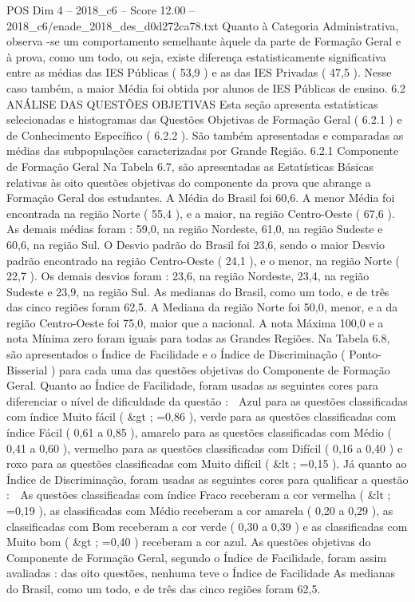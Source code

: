 \begin{textsample}{POS Dim 4 – 2018\_c6 – Score 12.00 – 2018\_c6/enade\_2018\_des\_d0d272ca78.txt}
Quanto à Categoria Administrativa, observa -se um comportamento semelhante àquele da parte de Formação Geral e à prova, como um todo, ou seja, existe diferença estatisticamente significativa entre as médias das IES Públicas ( 53,9 ) e as das IES Privadas ( 47,5 ).
Nesse caso também, a maior Média foi obtida por alunos de IES Públicas de ensino. 6.2 ANÁLISE DAS QUESTÕES OBJETIVAS Esta seção apresenta estatísticas selecionadas e histogramas das Questões Objetivas de Formação Geral ( 6.2.1 ) e de Conhecimento Específico ( 6.2.2 ).
São também apresentadas e comparadas as médias das subpopulações caracterizadas por Grande Região. 6.2.1 Componente de Formação Geral Na Tabela 6.7, são apresentadas as Estatísticas Básicas relativas às oito questões objetivas do componente da prova que abrange a Formação Geral dos estudantes.
A Média do Brasil foi 60,6.
A menor Média foi encontrada na região Norte ( 55,4 ), e a maior, na região Centro-Oeste ( 67,6 ).
As demais médias foram : 59,0, na região Nordeste, 61,0, na região Sudeste e 60,6, na região Sul.
O Desvio padrão do Brasil foi 23,6, sendo o maior Desvio padrão encontrado na região Centro-Oeste ( 24,1 ), e o menor, na região Norte ( 22,7 ).
Os demais desvios foram : 23,6, na região Nordeste, 23,4, na região Sudeste e 23,9, na região Sul.
As medianas do Brasil, como um todo, e de três das cinco regiões foram 62,5.
A Mediana da região Norte foi 50,0, menor, e a da região Centro-Oeste foi 75,0, maior que a nacional.
A nota Máxima 100,0 e a nota Mínima zero foram iguais para todas as Grandes Regiões.
Na Tabela 6.8, são apresentados o Índice de Facilidade e o Índice de Discriminação ( Ponto-Bisserial ) para cada uma das questões objetivas do Componente de Formação Geral.
Quanto ao Índice de Facilidade, foram usadas as seguintes cores para diferenciar o nível de dificuldade da questão :  Azul para as questões classificadas com índice Muito fácil ( \&gt ; =0,86 ), verde para as questões classificadas com índice Fácil ( 0,61 a 0,85 ), amarelo para as questões classificadas com Médio ( 0,41 a 0,60 ), vermelho para as questões classificadas com Difícil ( 0,16 a 0,40 ) e roxo para as questões classificadas com Muito difícil ( \&lt ; =0,15 ).
Já quanto ao Índice de Discriminação, foram usadas as seguintes cores para qualificar a questão :  As questões classificadas com índice Fraco receberam a cor vermelha ( \&lt ; =0,19 ), as classificadas com Médio receberam a cor amarela ( 0,20 a 0,29 ), as classificadas com Bom receberam a cor verde ( 0,30 a 0,39 ) e as classificadas com Muito bom ( \&gt ; =0,40 ) receberam a cor azul.
As questões objetivas do Componente de Formação Geral, segundo o Índice de Facilidade, foram assim avaliadas : das oito questões, nenhuma teve o Índice de Facilidade As medianas do Brasil, como um todo, e de três das cinco regiões foram 62,5.

\end{textsample}
